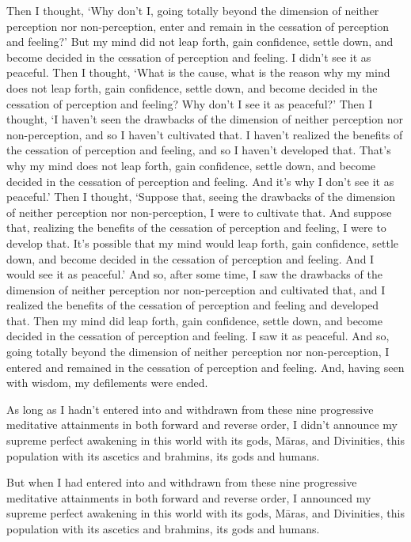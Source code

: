 \documentclass[12pt,openany]{book}%
\begin{document}
Then I thought, ‘Why don’t I, going totally beyond the dimension of neither perception nor non-perception, enter and remain in the cessation of perception and feeling?’ But my mind did not leap forth, gain confidence, settle down, and become decided in the cessation of perception and feeling. I didn’t see it as peaceful. Then I thought, ‘What is the cause, what is the reason why my mind does not leap forth, gain confidence, settle down, and become decided in the cessation of perception and feeling? Why don’t I see it as peaceful?’ Then I thought, ‘I haven’t seen the drawbacks of the dimension of neither perception nor non-perception, and so I haven’t cultivated that. I haven’t realized the benefits of the cessation of perception and feeling, and so I haven’t developed that. That’s why my mind does not leap forth, gain confidence, settle down, and become decided in the cessation of perception and feeling. And it’s why I don’t see it as peaceful.’ Then I thought, ‘Suppose that, seeing the drawbacks of the dimension of neither perception nor non-perception, I were to cultivate that. And suppose that, realizing the benefits of the cessation of perception and feeling, I were to develop that. It’s possible that my mind would leap forth, gain confidence, settle down, and become decided in the cessation of perception and feeling. And I would see it as peaceful.’ And so, after some time, I saw the drawbacks of the dimension of neither perception nor non-perception and cultivated that, and I realized the benefits of the cessation of perception and feeling and developed that. Then my mind did leap forth, gain confidence, settle down, and become decided in the cessation of perception and feeling. I saw it as peaceful. And so, going totally beyond the dimension of neither perception nor non-perception, I entered and remained in the cessation of perception and feeling. And, having seen with wisdom, my defilements were ended. 

As long as I hadn’t entered into and withdrawn from these nine progressive meditative attainments in both forward and reverse order, I didn’t announce my supreme perfect awakening in this world with its gods, \textsanskrit{Māras}, and Divinities, this population with its ascetics and brahmins, its gods and humans. 

But when I had entered into and withdrawn from these nine progressive meditative attainments in both forward and reverse order, I announced my supreme perfect awakening in this world with its gods, \textsanskrit{Māras}, and Divinities, this population with its ascetics and brahmins, its gods and humans. 
\end{document}
